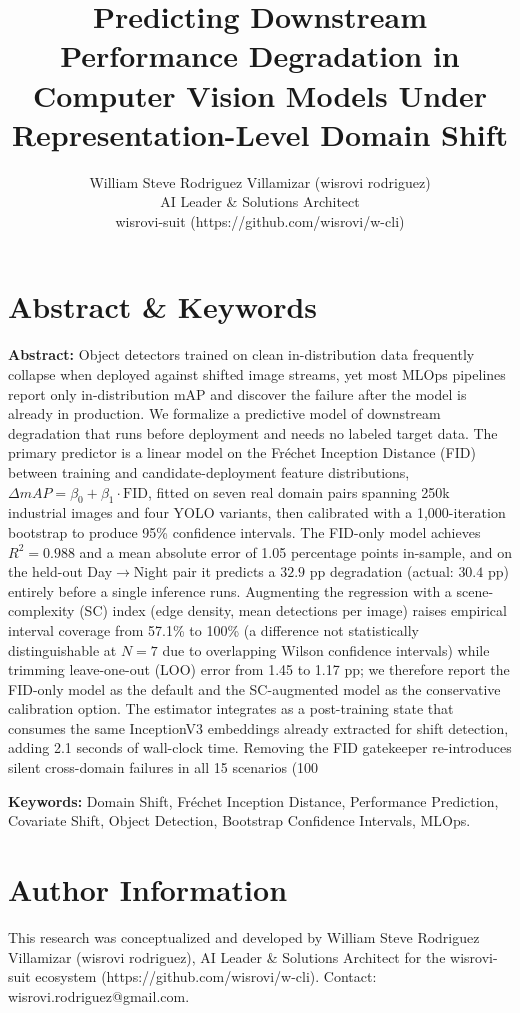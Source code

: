 \documentclass[10pt,twocolumn,letterpaper]{article}
\title{Predicting Downstream Performance Degradation in Computer Vision Models Under Representation-Level Domain Shift}
\author{William Steve Rodriguez Villamizar (wisrovi rodriguez)\\AI Leader \& Solutions Architect\\wisrovi-suit (https://github.com/wisrovi/w-cli)}
\date{}
\begin{document}
\maketitle

\section{Abstract \& Keywords}
\textbf{Abstract:} Object detectors trained on clean in-distribution data frequently collapse when deployed against shifted image streams, yet most MLOps pipelines report only in-distribution mAP and discover the failure after the model is already in production. We formalize a predictive model of downstream degradation that runs before deployment and needs no labeled target data. The primary predictor is a linear model on the Fr\'echet Inception Distance (FID) between training and candidate-deployment feature distributions, $\Delta mAP = \beta_0 + \beta_1 \cdot \text{FID}$, fitted on seven real domain pairs spanning 250k industrial images and four YOLO variants, then calibrated with a 1,000-iteration bootstrap to produce 95\% confidence intervals. The FID-only model achieves $R^2 = 0.988$ and a mean absolute error of 1.05 percentage points in-sample, and on the held-out Day$\rightarrow$Night pair it predicts a $32.9$ pp degradation (actual: $30.4$ pp) entirely before a single inference runs. Augmenting the regression with a scene-complexity (SC) index (edge density, mean detections per image) raises empirical interval coverage from 57.1\% to 100\% (a difference not statistically distinguishable at $N=7$ due to overlapping Wilson confidence intervals) while trimming leave-one-out (LOO) error from 1.45 to 1.17 pp; we therefore report the FID-only model as the default and the SC-augmented model as the conservative calibration option. The estimator integrates as a post-training state that consumes the same InceptionV3 embeddings already extracted for shift detection, adding 2.1 seconds of wall-clock time. Removing the FID gatekeeper re-introduces silent cross-domain failures in all 15 scenarios (100%



\textbf{Keywords:} Domain Shift, Fr\'echet Inception Distance, Performance Prediction, Covariate Shift, Object Detection, Bootstrap Confidence Intervals, MLOps.

\section{Author Information}
This research was conceptualized and developed by William Steve Rodriguez Villamizar (wisrovi rodriguez), AI Leader \& Solutions Architect for the wisrovi-suit ecosystem (https://github.com/wisrovi/w-cli). Contact: wisrovi.rodriguez@gmail.com.
\end{document}
